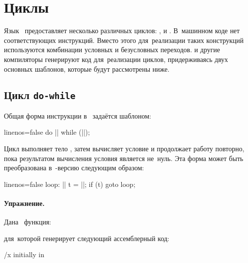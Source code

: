 
\section{Циклы}
Язык~ предоставляет несколько различных циклов: ,  и . В~машинном коде нет соответствующих инструкций. Вместо этого для~реализации таких конструкций используются комбинации условных и безусловных переходов. \GCC{} и другие компиляторы генерируют код для~реализации циклов, придерживаясь двух основных шаблонов, которые будут рассмотрены ниже.



\subsection{Цикл \texttt{do-while}}
Общая форма инструкции  в~ задаётся шаблоном:

\begin{ccode*}{linenos=false}
do
  ||
  while (||);
\end{ccode*}

\noindent Цикл выполняет тело , затем вычисляет условие  и продолжает работу повторно, пока результатом вычисления условия является не~нуль. Эта форма может быть преобразована в~-версию следующим образом:

\begin{ccode*}{linenos=false}
loop:
  ||
  t = ||;
  if (t)
    goto loop;
\end{ccode*}



\paragraph{Упражнение.}
Дана~ функция:


\noindent для~которой \GCC{} генерирует следующий ассемблерный код:

\precomment/x initially in %
\vspace{-1.7\baselineskip}

